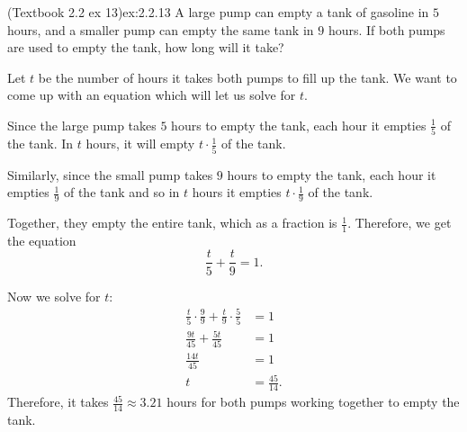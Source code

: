 \documentclass{article}
\begin{document}
\begin{example}{(Textbook 2.2 ex 13)}{ex:2.2.13}
    A large pump can empty a tank of gasoline in $5$ hours, and a smaller pump can empty the same tank in $9$ hours. If both pumps are used to empty the tank, how long will it take?
\end{example}
\begin{solution}
    Let $t$ be the number of hours it takes both pumps to fill up the tank. We want to come up with an equation which will let us solve for $t$.

    Since the large pump takes $5$ hours to empty the tank, each hour it empties $\frac{1}{5}$ of the tank. In $t$ hours, it will empty $t\cdot\frac{1}{5}$ of the tank.

    Similarly, since the small pump takes $9$ hours to empty the tank, each hour it empties $\frac{1}{9}$ of the tank and so in $t$ hours it empties $t\cdot\frac{1}{9}$ of the tank.

    Together, they empty the entire tank, which as a fraction is $\frac{1}{1}$. Therefore, we get the equation \[\frac{t}{5}+\frac{t}{9}=1.\]

    Now we solve for $t$:
    \begin{align*}
        \frac{t}{5}\cdot\frac{9}{9}+\frac{t}{9}\cdot\frac{5}{5}&=1\\
        \frac{9t}{45}+\frac{5t}{45}&=1\\
        \frac{14t}{45}&=1\\
        t&=\frac{45}{14}.
    \end{align*}
    Therefore, it takes $\frac{45}{14}\approx3.21$ hours for both pumps working together to empty the tank.
\end{solution}
\end{document}
